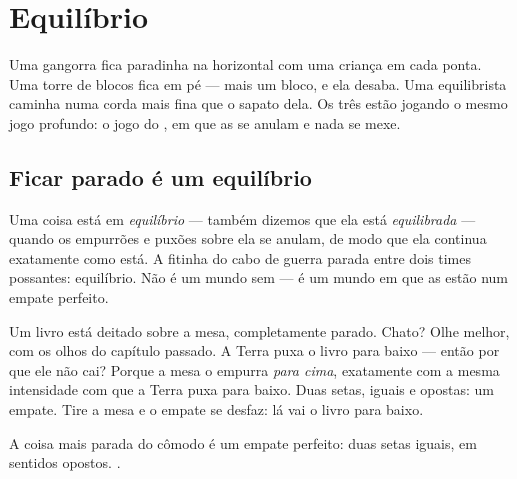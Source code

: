 \chapter{Equilíbrio}\label{ch:g2:balance-equilibrium}

Uma gangorra fica paradinha na horizontal com uma criança em cada
ponta. Uma torre de blocos fica em pé --- mais um bloco, e ela
desaba. Uma equilibrista caminha numa corda mais fina que o sapato
dela. Os três estão jogando o mesmo jogo profundo: o jogo do
, em que as  se anulam e nada se mexe.

\section{Ficar parado é um equilíbrio}

\begin{definition}[Equilíbrio]\label{def:g2:balance-equilibrium:equilibrium}
Uma coisa está em \emph{equilíbrio} --- também
dizemos que ela está \emph{equilibrada} --- quando
os empurrões e puxões sobre ela se anulam, de modo que ela continua
exatamente como está. A fitinha do cabo de guerra parada entre dois
times possantes: equilíbrio. Não é um mundo sem  --- é um mundo
em que as  estão num empate perfeito.
\end{definition}

\begin{example}\label{ex:g2:balance-equilibrium:book}
Um livro está deitado sobre a mesa, completamente parado. Chato? Olhe
melhor, com os olhos do capítulo passado. A Terra puxa o livro para
baixo --- então por que ele não cai? Porque a mesa o empurra
\emph{para cima}, exatamente com a mesma intensidade com que a Terra
puxa para baixo. Duas setas, iguais e opostas: um empate. Tire a mesa
e o empate se desfaz: lá vai o livro para baixo.
\end{example}

\begin{omfigure}

{\small A coisa mais parada do cômodo é um empate perfeito: duas
setas iguais, em sentidos opostos. .}
\end{omfigure}

